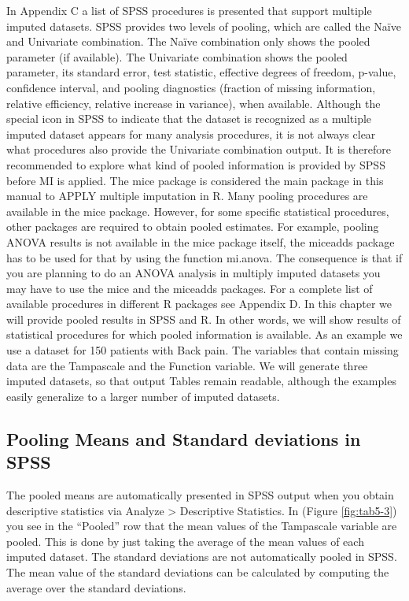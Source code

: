 \documentclass[]{book}
\theoremstyle{definition}
\theoremstyle{definition}
\theoremstyle{definition}
\theoremstyle{remark}
\begin{document}
In Appendix C a list of SPSS procedures is presented that support
multiple imputed datasets. SPSS provides two levels of pooling, which
are called the Naïve and Univariate combination. The Naïve combination
only shows the pooled parameter (if available). The Univariate
combination shows the pooled parameter, its standard error, test
statistic, effective degrees of freedom, p-value, confidence interval,
and pooling diagnostics (fraction of missing information, relative
efficiency, relative increase in variance), when available. Although the
special icon in SPSS to indicate that the dataset is recognized as a
multiple imputed dataset appears for many analysis procedures, it is not
always clear what procedures also provide the Univariate combination
output. It is therefore recommended to explore what kind of pooled
information is provided by SPSS before MI is applied. The mice package
is considered the main package in this manual to APPLY multiple
imputation in R. Many pooling procedures are available in the mice
package. However, for some specific statistical procedures, other
packages are required to obtain pooled estimates. For example, pooling
ANOVA results is not available in the mice package itself, the miceadds
package has to be used for that by using the function mi.anova. The
consequence is that if you are planning to do an ANOVA analysis in
multiply imputed datasets you may have to use the mice and the miceadds
packages. For a complete list of available procedures in different R
packages see Appendix D. In this chapter we will provide pooled results
in SPSS and R. In other words, we will show results of statistical
procedures for which pooled information is available. As an example we
use a dataset for 150 patients with Back pain. The variables that
contain missing data are the Tampascale and the Function variable. We
will generate three imputed datasets, so that output Tables remain
readable, although the examples easily generalize to a larger number of
imputed datasets.

\subsection{Pooling Means and Standard deviations in
SPSS}\label{pooling-means-and-standard-deviations-in-spss}

The pooled means are automatically presented in SPSS output when you
obtain descriptive statistics via Analyze \textgreater{} Descriptive
Statistics. In (Figure \ref{fig:tab5-3}) you see in the ``Pooled'' row
that the mean values of the Tampascale variable are pooled. This is done
by just taking the average of the mean values of each imputed dataset.
The standard deviations are not automatically pooled in SPSS. The mean
value of the standard deviations can be calculated by computing the
average over the standard deviations.
\end{document}
